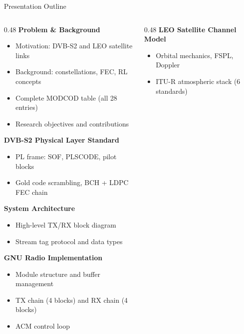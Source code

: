 \documentclass[aspectratio=169,10pt]{beamer}
\begin{document}
\begin{frame}{Presentation Outline}
  \begin{columns}[T]
    \begin{column}{0.48\textwidth}
      \textbf{\color{NUSblue}Problem \& Background}
      \begin{itemize}\scriptsize
        \item Motivation: DVB-S2 and LEO satellite links
        \item Background: constellations, FEC, RL concepts
        \item Complete MODCOD table (all 28 entries)
        \item Research objectives and contributions
      \end{itemize}
      \vspace{0.3em}
      \textbf{\color{NUSblue}DVB-S2 Physical Layer Standard}
      \begin{itemize}\scriptsize
        \item PL frame: SOF, PLSCODE, pilot blocks
        \item Gold code scrambling, BCH + LDPC FEC chain
      \end{itemize}
      \vspace{0.3em}
      \textbf{\color{NUSblue}System Architecture}
      \begin{itemize}\scriptsize
        \item High-level TX/RX block diagram
        \item Stream tag protocol and data types
      \end{itemize}
      \vspace{0.3em}
      \textbf{\color{NUSblue}GNU Radio Implementation}
      \begin{itemize}\scriptsize
        \item Module structure and buffer management
        \item TX chain (4 blocks) and RX chain (4 blocks)
        \item ACM control loop
      \end{itemize}
    \end{column}
    \begin{column}{0.48\textwidth}
      \textbf{\color{NUSblue}LEO Satellite Channel Model}
      \begin{itemize}\scriptsize
        \item Orbital mechanics, FSPL, Doppler
        \item ITU-R atmospheric stack (6 standards)

\end{itemize}
\end{column}
\end{columns}
\end{frame}
\end{document}
